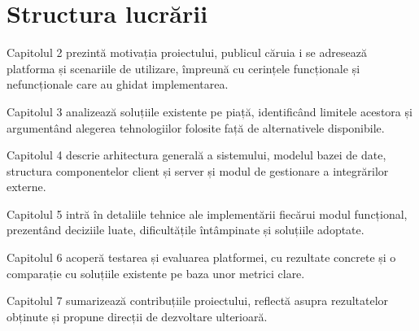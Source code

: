 \section{Structura lucrării}
Capitolul 2 prezintă motivația proiectului, publicul căruia i se adresează platforma și scenariile de utilizare, împreună cu cerințele funcționale și nefuncționale care au ghidat implementarea.

Capitolul 3 analizează soluțiile existente pe piață, identificând limitele acestora și argumentând alegerea tehnologiilor folosite față de alternativele disponibile.

Capitolul 4 descrie arhitectura generală a sistemului, modelul bazei de date, structura componentelor client și server și modul de gestionare a integrărilor externe.

Capitolul 5 intră în detaliile tehnice ale implementării fiecărui modul funcțional, prezentând deciziile luate, dificultățile întâmpinate și soluțiile adoptate.

Capitolul 6 acoperă testarea și evaluarea platformei, cu rezultate concrete și o comparație cu soluțiile existente pe baza unor metrici clare.

Capitolul 7 sumarizează contribuțiile proiectului, reflectă asupra rezultatelor obținute și propune direcții de dezvoltare ulterioară.
